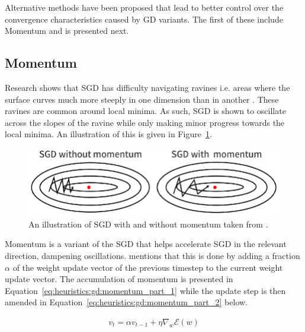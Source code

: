 Alternative methods have been proposed that lead to better control over the convergence characteristics caused by \ac{GD} variants. The first of these include \ac{Momentum} and is presented next.


\subsection{Momentum}
\label{sec:heuristics:gd:momentum}

Research shows that \ac{SGD} has difficulty navigating ravines i.e. areas where the surface curves much more steeply in one dimension than in another \cite{ref:sutton:1986}. These ravines are common around local minima. As such, \ac{SGD} is shown to oscillate across the slopes of the ravine while only making minor progress towards the local minima. An illustration of this is given in Figure~\ref{fig:heuristics:gd:sgd_with_and_without_momentum}.

\begin{figure}[htbp]
      \includegraphics[width=\textwidth]{images/sgd_with_and_without_momentum.png}
      \caption{An illustration of \ac{SGD} with and without momentum taken from \cite{ref:du:2019}.}
      \label{fig:heuristics:gd:sgd_with_and_without_momentum}
\end{figure}

Momentum \cite{ref:qian:1999} is a variant of the \ac{SGD} that helps accelerate \ac{SGD} in the relevant direction, dampening oscillations. \cite{ref:ruder:2016} mentions that this is done by adding a fraction $\alpha$ of the weight update vector of the previous timestep to the current weight update vector. The accumulation of momentum is presented in Equation~\ref{eq:heuristics:gd:momentum_part_1} while the update step is then amended in Equation~\ref{eq:heuristics:gd:momentum_part_2} below.

\begin{equation}
      \label{eq:heuristics:gd:momentum_part_1}
      \begin{split}
            v_{t} = \alpha v_{t-1} + \eta \nabla_{w}\mathcal{E}(w)
      \end{split}
\end{equation}

